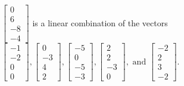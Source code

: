 \begin{exercise}
\begin{exerciseStatement}
  \end{exerciseStatement}
  \begin{exerciseAnswer}
   \(\left[\begin{array}{c}
0 \\
6 \\
-8 \\
-4
\end{array}\right]\) 
  	 is  
	a linear combination of the vectors \(\left[\begin{array}{c}
-1 \\
-2 \\
0 \\
0
\end{array}\right] , \left[\begin{array}{c}
0 \\
-3 \\
4 \\
2
\end{array}\right] , \left[\begin{array}{c}
-5 \\
0 \\
-5 \\
-3
\end{array}\right] , \left[\begin{array}{c}
2 \\
2 \\
-3 \\
0
\end{array}\right] , \text{ and } \left[\begin{array}{c}
-2 \\
2 \\
3 \\
-2
\end{array}\right]\).

	
  


  \end{exerciseAnswer}
\end{exercise}